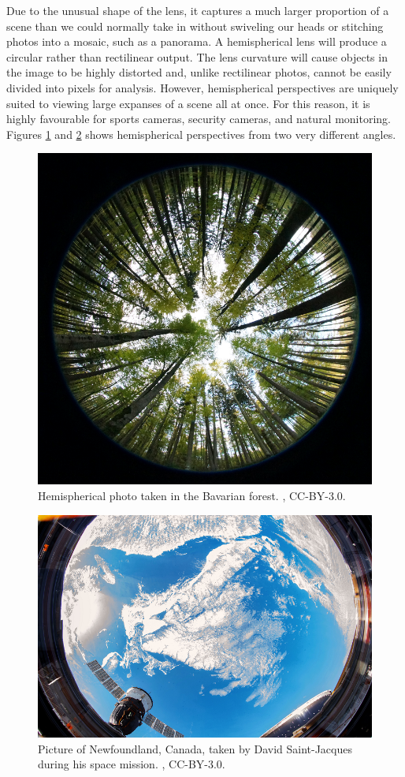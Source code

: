 \documentclass[
]{book}
\begin{document}
Due to the unusual shape of the lens, it captures a much larger proportion of a scene than we could normally take in without swiveling our heads or stitching photos into a mosaic, such as a panorama. A hemispherical lens will produce a circular rather than rectilinear output. The lens curvature will cause objects in the image to be highly distorted and, unlike rectilinear photos, cannot be easily divided into pixels for analysis. However, hemispherical perspectives are uniquely suited to viewing large expanses of a scene all at once. For this reason, it is highly favourable for sports cameras, security cameras, and natural monitoring. Figures \ref{fig:12-hemispherical-lens} and \ref{fig:12-newfoundland-from-space} shows hemispherical perspectives from two very different angles.



\begin{figure}
\includegraphics[width=0.75\linewidth]{images/12-hemispherical-lens} \caption{Hemispherical photo taken in the Bavarian forest. \citep{wegmann_hemispherical_2011}, CC-BY-3.0.}\label{fig:12-hemispherical-lens}
\end{figure}



\begin{figure}
\includegraphics[width=0.75\linewidth]{images/12-newfoundland_from_space} \caption{Picture of Newfoundland, Canada, taken by David Saint-Jacques during his space mission. \citep{canadian_space_agency_newfoundland_2019}, CC-BY-3.0.}\label{fig:12-newfoundland-from-space}
\end{figure}
\end{document}
